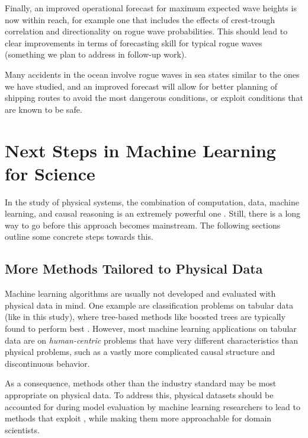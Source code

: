 Finally, an improved operational forecast for maximum expected wave heights is now within reach, for example one that includes the effects of crest-trough correlation and directionality on rogue wave probabilities. This should lead to clear improvements in terms of forecasting skill for typical rogue waves (something we plan to address in follow-up work).

Many accidents in the ocean involve rogue waves in sea states similar to the ones we have studied, and an improved forecast will allow for better planning of shipping routes to avoid the most dangerous conditions, or exploit conditions that are known to be safe.

\clearpage
\section{Next Steps in Machine Learning for Science}

%
In the study of physical systems, the combination of computation, data, machine learning, and causal reasoning is an extremely powerful one \citep{reichstein_deep_2019,lavin_simulation_2021}. Still, there is a long way to go before this approach becomes mainstream. The following sections outline some concrete steps towards this.

\subsection{More Methods Tailored to Physical Data}

Machine learning algorithms are usually not developed and evaluated with physical data in mind.
One example are classification problems on tabular data (like in this study), where tree-based methods like boosted trees \citep[\eg via XGBoost,][]{Chen:2016:XST:2939672.2939785} are typically found to perform best \citep{shwartz-ziv_tabular_2022}. However, most machine learning applications on tabular data are on \emph{human-centric} problems that have very different characteristics than physical problems, such as a vastly more complicated causal structure and discontinuous behavior.

As a consequence, methods other than the industry standard may be most appropriate on physical data. To address this, physical datasets should be accounted for during model evaluation by machine learning researchers to lead to methods that exploit , while making them more approachable for domain scientists.

